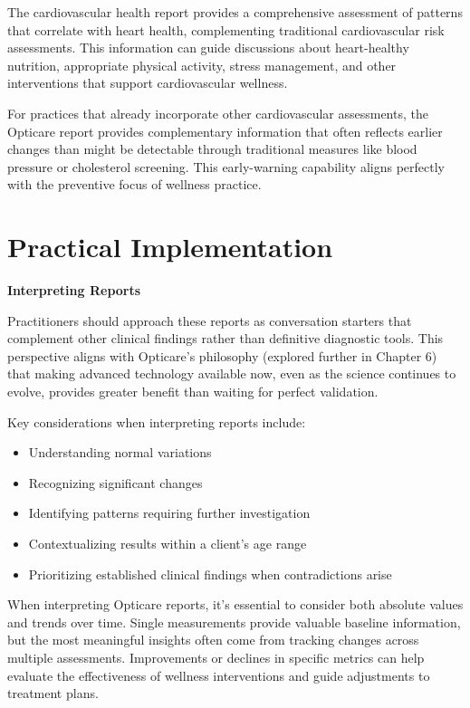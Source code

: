 \documentclass[
  Letterpaper,
]{scrbook}
\providecommand{\tightlist}{%
  \setlength{\itemsep}{0pt}\setlength{\parskip}{0pt}}\usepackage{longtable,booktabs,array}
\begin{document}
The cardiovascular health report provides a comprehensive assessment of
patterns that correlate with heart health, complementing traditional
cardiovascular risk assessments. This information can guide discussions
about heart-healthy nutrition, appropriate physical activity, stress
management, and other interventions that support cardiovascular
wellness.

For practices that already incorporate other cardiovascular assessments,
the Opticare report provides complementary information that often
reflects earlier changes than might be detectable through traditional
measures like blood pressure or cholesterol screening. This
early-warning capability aligns perfectly with the preventive focus of
wellness practice.

\section{Practical Implementation}\label{practical-implementation}

\textbf{Interpreting Reports}

Practitioners should approach these reports as conversation starters
that complement other clinical findings rather than definitive
diagnostic tools. This perspective aligns with Opticare's philosophy
(explored further in Chapter 6) that making advanced technology
available now, even as the science continues to evolve, provides greater
benefit than waiting for perfect validation.

Key considerations when interpreting reports include:

\begin{itemize}
\tightlist
\item
  Understanding normal variations
\item
  Recognizing significant changes
\item
  Identifying patterns requiring further investigation
\item
  Contextualizing results within a client's age range
\item
  Prioritizing established clinical findings when contradictions arise
\end{itemize}

When interpreting Opticare reports, it's essential to consider both
absolute values and trends over time. Single measurements provide
valuable baseline information, but the most meaningful insights often
come from tracking changes across multiple assessments. Improvements or
declines in specific metrics can help evaluate the effectiveness of
wellness interventions and guide adjustments to treatment plans.
\end{document}

